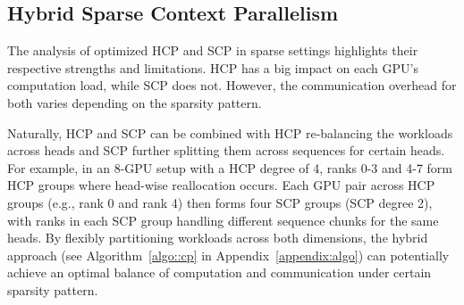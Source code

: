 \subsection{Hybrid Sparse Context Parallelism } 

The analysis of optimized HCP and SCP in sparse settings highlights their respective strengths and limitations. 
HCP has a big impact on each GPU's computation load, while SCP does not. However, the communication overhead for both varies depending on the sparsity pattern.

Naturally, HCP and SCP can be combined with HCP re-balancing the workloads across heads and SCP further splitting them across sequences for certain heads. For example, in an 8-GPU setup {with a HCP degree of 4,} ranks 0-3 and 4-7 form HCP groups where head-wise reallocation occurs. Each GPU pair across HCP groups (e.g., rank 0 and rank 4) then forms four SCP groups (SCP degree 2), with ranks in each SCP group handling different sequence chunks for the same heads. 
By flexibly partitioning workloads across both dimensions, the hybrid approach (see Algorithm~\ref{algo::cp} in Appendix~\ref{appendix:algo}) can potentially achieve an optimal balance of computation and communication under certain sparsity pattern. 


